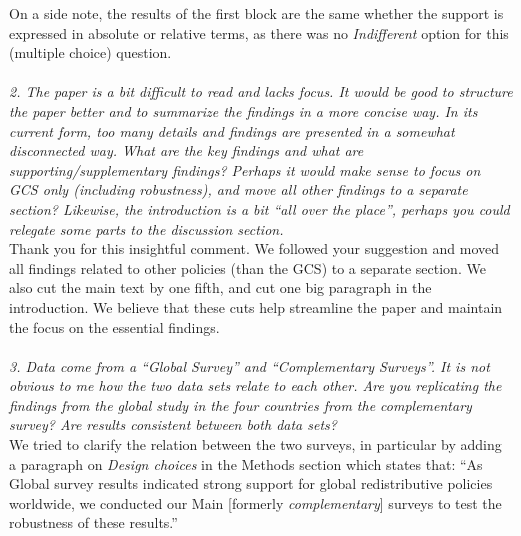 \documentclass[12pt,english]{article}
\begin{document}
On a side note, the results of the first block are the same whether the support is expressed in absolute or relative terms, as there was no \textit{Indifferent} option for this (multiple choice) question.
~\\ ~\\

\textit{2. The paper is a bit difficult to read and lacks focus. It would be good to structure the paper better and to summarize the findings in a more concise way. In its current form, too many details and findings are presented in a somewhat disconnected way. What are the key findings and what are supporting/supplementary findings? Perhaps it would make sense to focus on GCS only (including robustness), and move all other findings to a separate section? Likewise, the introduction is a bit “all over the place”, perhaps you could relegate some parts to the discussion section.}~\\

Thank you for this insightful comment. We followed your suggestion and moved all findings related to other policies (than the GCS) to a separate section. We also cut the main text by one fifth, and cut one big paragraph in the introduction. We believe that these cuts help streamline the paper and maintain the focus on the essential findings.
~\\ ~\\


\textit{3. Data come from a “Global Survey” and “Complementary Surveys”. It is not obvious to me how the two data sets relate to each other. Are you replicating the findings from the global study in the four countries from the complementary survey? Are results consistent between both data sets?}~\\

We tried to clarify the relation between the two surveys, in particular by adding a paragraph on \textit{Design choices} in the Methods section which states that: ``As Global survey results indicated strong support for global redistributive policies worldwide, we conducted our Main [formerly \textit{complementary}] surveys to test the robustness of these results.'' 

\end{document}
